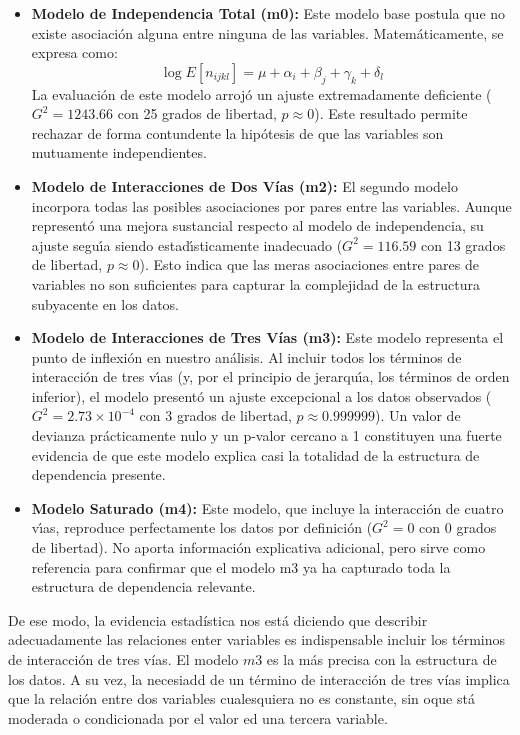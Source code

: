 \begin{itemize}
    \item \textbf{Modelo de Independencia Total (m0):} Este modelo base postula que no existe asociaci\'{o}n alguna entre ninguna de las variables. Matem\'{a}ticamente, se expresa como:
    $$ \log E[n_{ijkl}] = \mu + \alpha_i + \beta_j + \gamma_k + \delta_l $$
    La evaluaci\'{o}n de este modelo arroj\'{o} un ajuste extremadamente deficiente ($G^2 = 1243.66$ con 25 grados de libertad, $p \approx 0$). Este resultado permite rechazar de forma contundente la hip\'{o}tesis de que las variables son mutuamente independientes.

    \item \textbf{Modelo de Interacciones de Dos Vías (m2):} El segundo modelo incorpora todas las posibles asociaciones por pares entre las variables. Aunque represent\'{o} una mejora sustancial respecto al modelo de independencia, su ajuste segu\'{\i}a siendo estad\'{\i}sticamente inadecuado ($G^2 = 116.59$ con 13 grados de libertad, $p \approx 0$). Esto indica que las meras asociaciones entre pares de variables no son suficientes para capturar la complejidad de la estructura subyacente en los datos.

    \item \textbf{Modelo de Interacciones de Tres Vías (m3):} Este modelo representa el punto de inflexi\'{o}n en nuestro an\'{a}lisis. Al incluir todos los t\'{e}rminos de interacci\'{o}n de tres v\'{\i}as (y, por el principio de jerarqu\'{\i}a, los t\'{e}rminos de orden inferior), el modelo present\'{o} un ajuste excepcional a los datos observados ($G^2 = 2.73 \times 10^{-4}$ con 3 grados de libertad, $p \approx 0.999999$). Un valor de devianza pr\'{a}cticamente nulo y un p-valor cercano a 1 constituyen una fuerte evidencia de que este modelo explica casi la totalidad de la estructura de dependencia presente.

    \item \textbf{Modelo Saturado (m4):} Este modelo, que incluye la interacci\'{o}n de cuatro v\'{\i}as, reproduce perfectamente los datos por definici\'{o}n ($G^2 = 0$ con 0 grados de libertad). No aporta informaci\'{o}n explicativa adicional, pero sirve como referencia para confirmar que el modelo m3 ya ha capturado toda la estructura de dependencia relevante.
\end{itemize}

De ese modo, la evidencia estadística nos está diciendo que describir adecuadamente las relaciones enter variables
es indispensable incluir los términos de interacción de tres vías. El modelo $m3$ es la más precisa 
con la estructura de los datos. A su vez, la necesiadd de un término de interacción de tres vías implica
que la relación entre dos variables cualesquiera no es constante, sin oque stá moderada o condicionada 
por el valor ed una tercera variable. 

